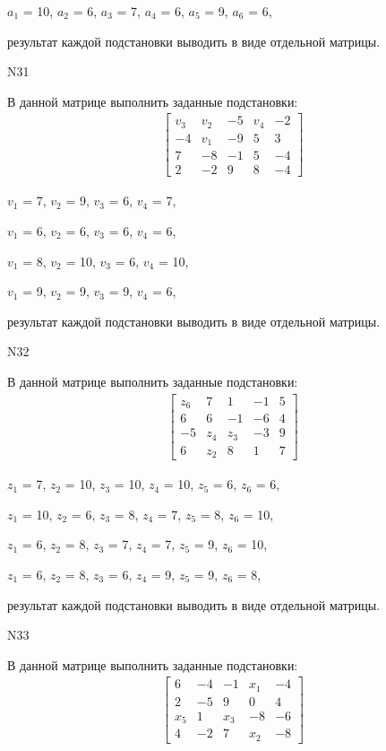 \documentclass[11pt]{report}
\begin{document}
$a_{1}$ = 10, $a_{2}$ = 6, $a_{3}$ = 7, $a_{4}$ = 6, $a_{5}$ = 9, $a_{6}$ = 6, 

результат каждой подстановки выводить в виде отдельной матрицы.

N31

В данной матрице выполнить заданные подстановки:
\begin{align*}
\left[\begin{matrix}v_{3} & v_{2} & -5 & v_{4} & -2\\-4 & v_{1} & -9 & 5 & 3\\7 & -8 & -1 & 5 & -4\\2 & -2 & 9 & 8 & -4\end{matrix}\right]
\end{align*}


$v_{1}$ = 7, $v_{2}$ = 9, $v_{3}$ = 6, $v_{4}$ = 7, 

$v_{1}$ = 6, $v_{2}$ = 6, $v_{3}$ = 6, $v_{4}$ = 6, 

$v_{1}$ = 8, $v_{2}$ = 10, $v_{3}$ = 6, $v_{4}$ = 10, 

$v_{1}$ = 9, $v_{2}$ = 9, $v_{3}$ = 9, $v_{4}$ = 6, 

результат каждой подстановки выводить в виде отдельной матрицы.

N32

В данной матрице выполнить заданные подстановки:
\begin{align*}
\left[\begin{matrix}z_{6} & 7 & 1 & -1 & 5\\6 & 6 & -1 & -6 & 4\\-5 & z_{4} & z_{3} & -3 & 9\\6 & z_{2} & 8 & 1 & 7\end{matrix}\right]
\end{align*}


$z_{1}$ = 7, $z_{2}$ = 10, $z_{3}$ = 10, $z_{4}$ = 10, $z_{5}$ = 6, $z_{6}$ = 6, 

$z_{1}$ = 10, $z_{2}$ = 6, $z_{3}$ = 8, $z_{4}$ = 7, $z_{5}$ = 8, $z_{6}$ = 10, 

$z_{1}$ = 6, $z_{2}$ = 8, $z_{3}$ = 7, $z_{4}$ = 7, $z_{5}$ = 9, $z_{6}$ = 10, 

$z_{1}$ = 6, $z_{2}$ = 8, $z_{3}$ = 6, $z_{4}$ = 9, $z_{5}$ = 9, $z_{6}$ = 8, 

результат каждой подстановки выводить в виде отдельной матрицы.

N33

В данной матрице выполнить заданные подстановки:
\begin{align*}
\left[\begin{matrix}6 & -4 & -1 & x_{1} & -4\\2 & -5 & 9 & 0 & 4\\x_{5} & 1 & x_{3} & -8 & -6\\4 & -2 & 7 & x_{2} & -8\end{matrix}\right]
\end{align*}
\end{document}
